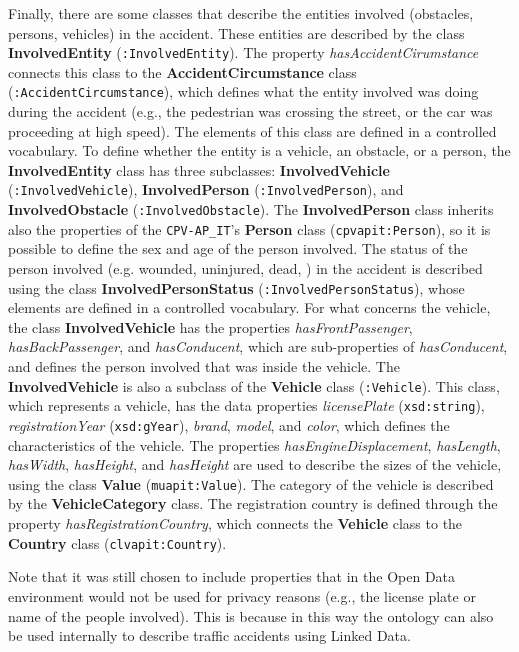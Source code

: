 Finally, there are some classes that describe the entities involved (obstacles, persons, vehicles) in the accident. These entities are described by the class \textbf{InvolvedEntity} (\verb#:InvolvedEntity#). The property \textit{hasAccidentCirumstance} connects this class to the \textbf{AccidentCircumstance} class (\verb#:AccidentCircumstance#), which defines what the entity involved was doing during the accident (e.g., the pedestrian was crossing the street, or the car was proceeding at high speed). The elements of this class are defined in a controlled vocabulary. To define whether the entity is a vehicle, an obstacle, or a person, the \textbf{InvolvedEntity} class has three subclasses: \textbf{InvolvedVehicle} (\verb#:InvolvedVehicle#), \textbf{InvolvedPerson} (\verb#:InvolvedPerson#), and \textbf{InvolvedObstacle} (\verb#:InvolvedObstacle#). The \textbf{InvolvedPerson} class inherits also the properties of the \verb#CPV-AP_IT#'s \textbf{Person} class (\verb#cpvapit:Person#), so it is possible to define the sex and age of the person involved. The status of the person involved (e.g. wounded, uninjured, dead, \etc) in the accident is described using the class \textbf{InvolvedPersonStatus} (\verb#:InvolvedPersonStatus#), whose elements are defined in a controlled vocabulary. For what concerns the vehicle, the class \textbf{InvolvedVehicle} has the properties \textit{hasFrontPassenger}, \textit{hasBackPassenger}, and \textit{hasConducent}, which are sub-properties of \textit{hasConducent}, and defines the person involved that was inside the vehicle. The \textbf{InvolvedVehicle} is also a subclass of the \textbf{Vehicle} class (\verb#:Vehicle#). This class, which represents a vehicle, has the data properties \textit{licensePlate} (\verb#xsd:string#), \textit{registrationYear} (\verb#xsd:gYear#), \textit{brand}, \textit{model}, and \textit{color}, which defines the characteristics of the vehicle. The properties \textit{hasEngineDisplacement}, \textit{hasLength}, \textit{hasWidth}, \textit{hasHeight}, and \textit{hasHeight} are used to describe the sizes of the vehicle, using the class \textbf{Value} (\verb#muapit:Value#). The category of the vehicle is described by the \textbf{VehicleCategory} class. The registration country is defined through the property \textit{hasRegistrationCountry}, which connects the \textbf{Vehicle} class to the \textbf{Country} class (\verb#clvapit:Country#).

Note that it was still chosen to include properties that in the Open Data environment would not be used for privacy reasons (e.g., the license plate or name of the people involved). This is because in this way the ontology can also be used internally to describe traffic accidents using Linked Data.

